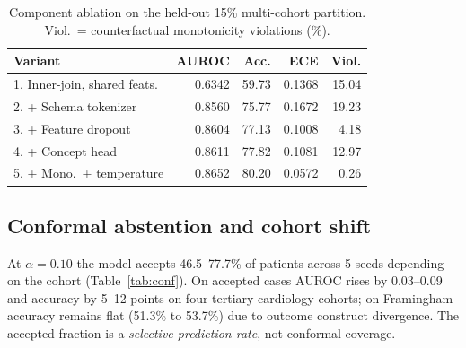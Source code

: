 \documentclass[journal]{IEEEtran}
\begin{document}
\begin{table}[t]
\caption{Component ablation on the held-out 15\% multi-cohort partition. Viol.\ = counterfactual monotonicity violations (\%).}
\label{tab:abl}
\centering\footnotesize
\begin{tabular}{p{2.9cm}rrrr}
\toprule
Variant & AUROC & Acc. & ECE & Viol.\\
\midrule
1. Inner-join, shared feats. & 0.6342 & 59.73 & 0.1368 & 15.04\\
2. + Schema tokenizer & 0.8560 & 75.77 & 0.1672 & 19.23\\
3. + Feature dropout & 0.8604 & 77.13 & 0.1008 & 4.18\\
4. + Concept head & 0.8611 & 77.82 & 0.1081 & 12.97\\
5. + Mono.\ + temperature & 0.8652 & 80.20 & 0.0572 & 0.26\\
\bottomrule
\end{tabular}
\end{table}

\subsection{Conformal abstention and cohort shift}\label{sec:conformal}
At $\alpha=0.10$ the model accepts 46.5--77.7\% of patients across 5 seeds depending on the cohort (Table~\ref{tab:conf}). On accepted cases AUROC rises by 0.03--0.09 and accuracy by 5--12 points on four tertiary cardiology cohorts; on Framingham accuracy remains flat (51.3\% to 53.7\%) due to outcome construct divergence. The accepted fraction is a \emph{selective-prediction rate}, not conformal coverage.
\end{document}

